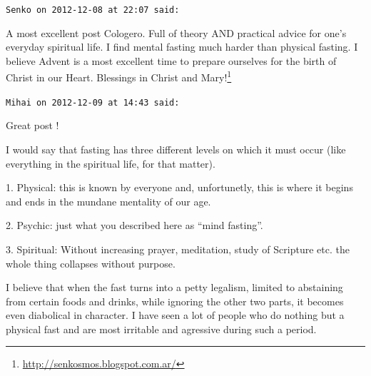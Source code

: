 \begin{footnotesize}\begin{sffamily}



\texttt{Senko on 2012-12-08 at 22:07 said: }

A most excellent post Cologero. Full of theory AND practical advice for one's everyday spiritual life. I find mental fasting much harder than physical fasting. I believe Advent is a most excellent time to prepare ourselves for the birth of Christ in our Heart. Blessings in Christ and Mary!\footnote{\url{http://senkosmos.blogspot.com.ar/}}


\hfill

\texttt{Mihai on 2012-12-09 at 14:43 said: }

Great post ! 

I would say that fasting has three different levels on which it must occur (like everything in the spiritual life, for that matter).

1. Physical: this is known by everyone and, unfortunetly, this is where it begins and ends in the mundane mentality of our age.

2. Psychic: just what you described here as “mind fasting”.

3. Spiritual: Without increasing prayer, meditation, study of Scripture etc. the whole thing collapses without purpose. 

I believe that when the fast turns into a petty legalism, limited to abstaining from certain foods and drinks, while ignoring the other two parts, it becomes even diabolical in character. I have seen a lot of people who do nothing but a physical fast and are most irritable and agressive during such a period.


\end{sffamily}\end{footnotesize}
